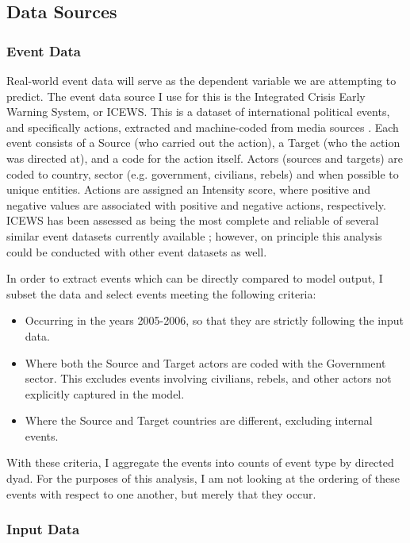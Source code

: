 \subsection{Data Sources} \label{data_sources}

\subsubsection{Event Data}

Real-world event data will serve as the dependent variable we are attempting to predict. The event data source I use for this is the Integrated Crisis Early Warning System, or ICEWS. This is a dataset of international political events, and specifically actions, extracted and machine-coded from media sources \citep{boschee_2015}. Each event consists of a Source (who carried out the action), a Target (who the action was directed at), and a code for the action itself. Actors (sources and targets) are coded to country, sector (e.g. government, civilians, rebels) and when possible to unique entities. Actions are assigned an Intensity score, where positive and negative values are associated with positive and negative actions, respectively. ICEWS has been assessed as being the most complete and reliable of several similar event datasets currently available \citep{ward_2013b}; however, on principle this analysis could be conducted with other event datasets as well.

In order to extract events which can be directly compared to model output, I subset the data and select events meeting the following criteria:

\begin{itemize}
    \item Occurring in the years 2005-2006, so that they are strictly following the input data.
    \item Where both the Source and Target actors are coded with the Government sector. This excludes events involving civilians, rebels, and other actors not explicitly captured in the model.
    \item Where the Source and Target countries are different, excluding internal events.
\end{itemize}

With these criteria, I aggregate the events into counts of event type by directed dyad. For the purposes of this analysis, I am not looking at the ordering of these events with respect to one another, but merely that they occur. 

\subsubsection{Input Data}

